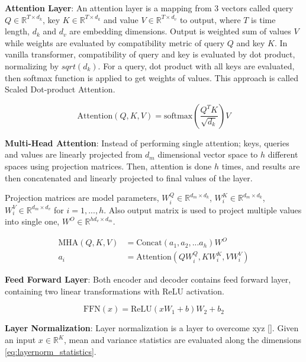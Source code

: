 \textbf{Attention Layer}: An attention layer is a mapping from 3 vectors called query $Q \in \mathbb{R}^{T \times d_k}$, key $K \in \mathbb{R}^{T \times d_k}$ and value $V \in \mathbb{R}^{T \times d_v}$ to output, where $T$ is time length, $d_k$ and $d_v$ are embedding dimensions. Output is weighted sum of values $V$ while weights are evaluated by compatibility metric of query $Q$ and key $K$. In vanilla transformer, compatibility of query and key is evaluated by dot product, normalizing by $sqrt(d_k)$. For a query, dot product with all keys are evaluated, then softmax function is applied to get weights of values. This approach is called Scaled Dot-product Attention.

\begin{equation}
\mathrm{Attention}(Q, K, V) = \mathrm{softmax}(\frac{Q^{T} K}{\sqrt{d_k}}) V
\end{equation}

\textbf{Multi-Head Attention}: Instead of performing single attention; keys, queries and values are linearly projected from $d_m$ dimensional vector space to $h$ different spaces using projection matrices. Then, attention is done $h$ times, and results are then concatenated and linearly projected to final values of the layer.

Projection matrices are model parameters, $W^Q_i \in \mathbb{R}^{d_m \times d_k}$, $W^K_i \in \mathbb{R}^{d_m \times d_k}$, $W^V_i \in \mathbb{R}^{d_m \times d_v}$ for $i=1,...,h$. Also output matrix is used to project multiple values into single one, $W^O \in \mathbb{R}^{h d_v \times d_m}$.

\begin{equation}
\begin{split}
\mathrm{MHA}(Q,K,V) &=  \text{Concat}(a_1, a_2, ... a_h)W^O \\
a_i &=  \text{Attention}(QW^Q_i,KW^K_i,VW^V_i)
\end{split}
\end{equation}

\textbf{Feed Forward Layer}: Both encoder and decoder contains feed forward layer, containing two linear transformations with ReLU activation.

\begin{equation}
\mathrm{FFN}(x) = \text{ReLU}(xW_1+b)W_2+b_2
\end{equation}

\textbf{Layer Normalization}: Layer normalization is a layer to overcome xyz []. Given an input $x \in \mathbb{R}^K$, mean and variance statistics are evaluated along the dimensions \eqref{eq:layernorm_statistics}.

